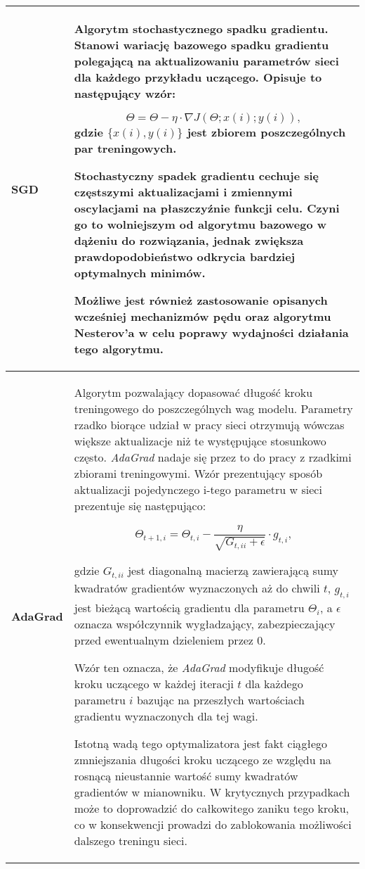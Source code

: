 \begin{enumerate}
\begin{longtable}{ |m{3cm}|m{10cm}| }
     \hline
       \textbf{SGD \cite{SGD}} &

       Algorytm stochastycznego spadku gradientu. Stanowi wariację bazowego spadku
       gradientu polegającą na aktualizowaniu parametrów sieci dla
       każdego przykładu uczącego. Opisuje to następujący wzór:

       \[\Theta = \Theta - \eta \cdot \nabla J(\Theta;x(i);y(i)),\]
       gdzie $\{x(i), y(i)\}$ jest zbiorem poszczególnych par treningowych.

       Stochastyczny spadek gradientu cechuje się częstszymi aktualizacjami i
       zmiennymi oscylacjami na płaszczyźnie funkcji celu. Czyni go to wolniejszym od
       algorytmu bazowego w dążeniu do rozwiązania, jednak zwiększa prawdopodobieństwo odkrycia
       bardziej optymalnych minimów.

       Możliwe jest również zastosowanie opisanych wcześniej mechanizmów pędu oraz
       algorytmu Nesterov'a w celu poprawy wydajności działania tego algorytmu. \\

     \hline
       \textbf{AdaGrad \cite{Adagrad}} &

        Algorytm pozwalający dopasować długość kroku treningowego do poszczególnych
        wag modelu. Parametry rzadko biorące udział w pracy sieci otrzymują wówczas
        większe aktualizacje niż te występujące stosunkowo często. \textit{AdaGrad} nadaje się
        przez to do pracy z rzadkimi zbiorami treningowymi. Wzór prezentujący sposób aktualizacji
        pojedynczego i-tego parametru w sieci prezentuje się następująco:

        \[\Theta_{t+1,i} = \Theta_{t,i} - \frac{\eta}{\sqrt{G_{t,ii} + \epsilon}} \cdot g_{t,i},\]

        gdzie $G_{t,ii}$ jest diagonalną macierzą zawierającą sumy kwadratów gradientów
        wyznaczonych aż do chwili $t$, $g_{t,i}$ jest bieżącą wartością gradientu dla parametru $\Theta_i$, a
        $\epsilon$ oznacza współczynnik wygładzający, zabezpieczający przed ewentualnym dzieleniem
        przez 0.

        Wzór ten oznacza, że \textit{AdaGrad} modyfikuje długość kroku uczącego w każdej iteracji $t$
        dla każdego parametru $i$ bazując na przeszłych wartościach gradientu wyznaczonych
        dla tej wagi.

        Istotną wadą tego optymalizatora jest fakt ciągłego zmniejszania długości
        kroku uczącego ze względu na rosnącą nieustannie wartość sumy kwadratów
        gradientów w mianowniku. W krytycznych przypadkach może to doprowadzić
        do całkowitego zaniku tego kroku, co w konsekwencji prowadzi do
        zablokowania możliwości dalszego treningu sieci. \\


\end{longtable}
\end{enumerate}
